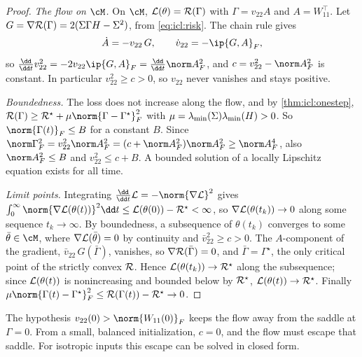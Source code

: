 \begin{refsection}
\begin{proof}
\emph{The flow on $\cM$.} On $\cM$, $\mathcal{L}(\theta)=\mathcal{R}(\Gamma)$ with $\Gamma=v_{22}A$ and $A=W_{11}^\top$. Let $G=\nabla\mathcal{R}(\Gamma)=2(\Sigma\Gamma H-\Sigma^2)$, from \eqref{eq:icl:risk}. The chain rule gives
\[
  \dot A=-v_{22}\,G,\qquad \dot v_{22}=-\ip{G,A}_F ,
\]
so $\frac{\dd}{\dd t}v_{22}^2=-2v_{22}\ip{G,A}_F=\frac{\dd}{\dd t}\norm A_F^2$, and $c=v_{22}^2-\norm A_F^2$ is constant. In particular $v_{22}^2\ge c>0$, so $v_{22}$ never vanishes and stays positive.

\emph{Boundedness.} The loss does not increase along the flow, and by \cref{thm:icl:onestep}, $\cR(\Gamma)\ge\cR^\star+\mu\norm{\Gamma-\Gamma^\star}_F^2$ with $\mu=\lambda_{\min}(\Sigma)\lambda_{\min}(H)>0$. So $\norm{\Gamma(t)}_F\le B$ for a constant $B$. Since $\norm\Gamma_F^2=v_{22}^2\norm A_F^2=(c+\norm A_F^2)\norm A_F^2\ge\norm A_F^4$, also $\norm A_F^2\le B$ and $v_{22}^2\le c+B$. A bounded solution of a locally Lipschitz equation exists for all time.

\emph{Limit points.} Integrating $\frac{\dd}{\dd t}\Loss=-\norm{\nabla\Loss}^2$ gives $\int_0^\infty\norm{\nabla\Loss(\theta(t))}^2\dd t\le\Loss(\theta(0))-\cR^\star<\infty$, so $\nabla\mathcal{L}(\theta(t_k))\to0$ along some sequence $t_k\to\infty$. By boundedness, a subsequence of $\theta(t_k)$ converges to some $\bar\theta\in\cM$, where $\nabla\mathcal{L}(\bar\theta)=0$ by continuity and $\bar v_{22}^2\ge c>0$. The $A$-component of the gradient, $\bar v_{22}\,G(\bar\Gamma)$, vanishes, so $\nabla\mathcal{R}(\bar\Gamma)=0$, and $\bar\Gamma=\Gamma^\star$, the only critical point of the strictly convex $\mathcal{R}$. Hence $\mathcal{L}(\theta(t_k))\to\mathcal{R}^\star$ along the subsequence; since $\mathcal{L}(\theta(t))$ is nonincreasing and bounded below by $\mathcal{R}^\star$, $\mathcal{L}(\theta(t))\to\mathcal{R}^\star$. Finally $\mu\norm{\Gamma(t)-\Gamma^\star}_F^2\le\cR(\Gamma(t))-\cR^\star\to0$.
\end{proof}

The hypothesis $v_{22}(0)>\norm{W_{11}(0)}_F$ keeps the flow away from the saddle at $\Gamma=0$. From a small, balanced initialization, $c=0$, and the flow must escape that saddle. For isotropic inputs this escape can be solved in closed form.



\end{refsection}
